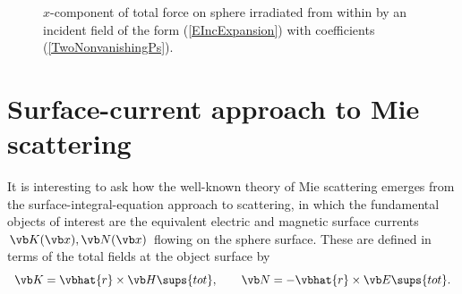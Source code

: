 \documentclass[letterpaper]{article}
\begin{document}
\begin{figure}[H]
\begin{center}
\caption{$x$-component of total force on sphere irradiated from 
         within by an incident field of the form (\ref{EIncExpansion}) 
         with coefficients (\ref{TwoNonvanishingPs}).
        }
\label{TotalForce}
\end{center}
\end{figure}
\newpage
\section{Surface-current approach to Mie scattering}

It is interesting to ask how the well-known theory of
Mie scattering emerges from the surface-integral-equation
approach to scattering, in which the fundamental objects
of interest are the equivalent electric and magnetic
surface currents $\vb K(\vb x), \vb N(\vb x)$ 
flowing on the sphere surface. These are defined in 
terms of the total fields at the object surface by
$$ \vb K=\vbhat{r}\times \vb H\sups{tot},
   \qquad
   \vb N=-\vbhat{r}\times \vb E\sups{tot}.
$$
\end{document}
